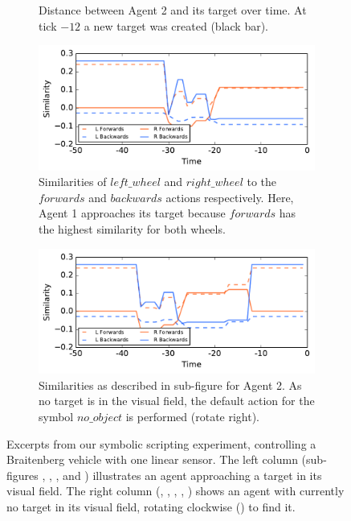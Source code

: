 \documentclass[journal]{journal}
\begin{document}
\begin{figure}
\begin{subfigure}{.49\columnwidth}
	\caption{Distance between Agent 2 and its target over time.
	At tick $-12$ a new target was created (black bar).}
	\label{fig:experiment:distance2}
\end{subfigure}
\begin{subfigure}{.49\columnwidth}
	\center
	\includegraphics[width=.98\columnwidth]{img/2_139.pdf}
	\caption{Similarities of $left\_wheel$ and $right\_wheel$ to
	the $forwards$ and $backwards$ actions respectively.
	Here, Agent 1 approaches its target because $forwards$ has the
	highest similarity for both wheels.}
	\label{fig:experiment:similar1}
\end{subfigure}
\begin{subfigure}{.49\columnwidth}
	\center
	\includegraphics[width=.98\columnwidth]{img/2_235.pdf}
	\caption{Similarities as described in sub-figure 
	for Agent 2. As no target is in the visual field, the default action for
	the symbol $no\_object$ is performed (rotate right).\\}
	\label{fig:experiment:similar2}
\end{subfigure}
\caption{Excerpts from our symbolic scripting experiment, controlling a
Braitenberg vehicle with one linear sensor.
The left column (sub-figures \protect{},
\protect{}, \protect{},
\protect{} and
\protect{}) illustrates an agent approaching a
target in its visual field.
The right column (\protect{},
\protect{}, \protect{},
\protect{},
\protect{}) shows an agent with currently no target in its
visual field, rotating clockwise (\protect{}) to
find it.
}
\label{fig:experiment}
\end{figure}
\end{document}
